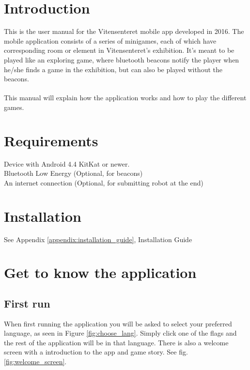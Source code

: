 \section{Introduction}

This is the user manual for the Vitensenteret mobile app developed in 2016. The mobile application consists of a series of minigames, each of which have corresponding room or element in Vitensenteret's exhibition. It's meant to be played like an exploring game, where bluetooth beacons notify the player when he/she finds a game in the exhibition, but can also be played without the beacons.
\\\\
This manual will explain how the application works and how to play the different games.


\section{Requirements}
Device with Android 4.4 KitKat or newer.\\
Bluetooth Low Energy (Optional, for beacons)\\
An internet connection (Optional, for submitting robot at the end)\\


\section{Installation}
See Appendix \ref{appendix:installation_guide}, Installation Guide

\section{Get to know the application}
\subsection{First run}
When first running the application you will be asked to select your preferred language, as seen in Figure \ref{fig:choose_lang}. Simply click one of the flags and the rest of the application will be in that language.
There is also a welcome screen with a introduction to the app and game story. See fig. \ref{fig:welcome_screen}.



